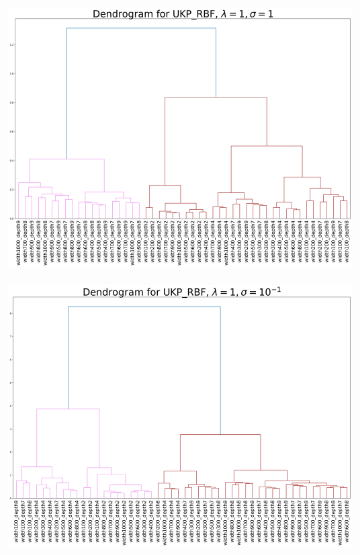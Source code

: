\documentclass[11pt]{article}
\theoremstyle{plain}
\begin{document}
\begin{figure}[!h]
    \centering
    \begin{subfigure}[b]{0.45\textwidth}
        \includegraphics[width=\textwidth]{Appendix figures/mnist_experiments/Dendogram/Dendogram for UKP_dist_RBF_1.000000e+00_1.000000e+00.png}
    \end{subfigure}
    \hfill
    \begin{subfigure}[b]{0.45\textwidth}
        \includegraphics[width=\textwidth]{Appendix figures/mnist_experiments/Dendogram/Dendogram for UKP_dist_RBF_1.000000e+00_1.000000e-01.png}
    \end{subfigure}
    
    \vspace{0.5cm}  %
    

\end{figure}
\end{document}
